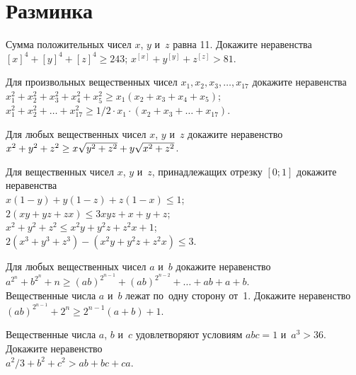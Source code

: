 
\section*{Разминка}


\begin{problems}

\item
Сумма положительных чисел $x$, $y$ и~$z$ равна 11.
Докажите неравенства
\\[0.3ex]
\subproblem
$[x]^4 + [y]^4 + [z]^4 \geq 243$;
\qquad
\subproblem
$x^{[x]} + y^{[y]} + z^{[z]} > 81$.

\item
Для произвольных вещественных чисел $x_1, x_2, x_3, \ldots, x_{17}$
докажите неравенства
\\[0.3ex]
\subproblem
\(
    x_1^2 + x_2^2 + x_3^2 + x_4^2 + x_5^2
\geq
    x_1 (x_2 + x_3 + x_4 + x_5)
\);
\\[0.5ex]
\subproblem
\(
    x_1^2 + x_2^2 + \ldots + x_{17}^2
\geq
   1 / 2 \cdot x_1 \cdot (x_2 + x_3 + \ldots + x_{17})
\).

\item
Для любых вещественных чисел $x$, $y$ и~$z$ докажите неравенство
\\[0.3ex]
\(
    x^2 + y^2  + z^2
\geq
    x \sqrt{\smash[b]{y}^2 + z^2} + y \sqrt{x^2 + z^2}
\).

\item
Для вещественных чисел $x$, $y$ и~$z$, принадлежащих отрезку $[0; 1]$
докажите неравенства
\\[0.3ex]
\subproblem
$x (1 - y) + y (1 - z) + z (1 - x) \leq 1$;
\\[0.5ex]
\subproblem
$2 (x y + y z + z x) \leq 3 x y z + x + y + z$;
\\[0.5ex]
\subproblem
$x^2 + y^2 + z^2 \leq x^2 y + y^2 z + z^2 x + 1$;
\\[0.5ex]
\subproblem
$2 (x^3 + y^3 + z^3) - (x^2 y + y^2 z + z^2 x) \leq 3$.

\item
\subproblem
Для любых вещественных чисел $a$ и~$b$ докажите неравенство
\\[0.3ex]
\(
    a^{2^n} + b^{2^n} + n
\geq
    (a b)^{2^{n-1}} + (ab)^{2^{n-2}} + \ldots + a b + a + b
\).
\\[0.5ex]
\subproblem
Вещественные числа $a$ и~$b$ лежат по~одну сторону от~1.
Докажите неравенство
\\[0.3ex]
\(
    (a b)^{2^{n-1}} + 2^n
\geq
    2^{n-1}(a + b) + 1
\).

\item
Вещественные числа $a$, $b$ и~$c$ удовлетворяют условиям $a b c = 1$
и~$a^3 > 36$.
Докажите неравенство
\\[0.3ex]
\(
    a^2 / 3 + b^2 + c^2
>
    a b + b c + c a
\).

\end{problems}

